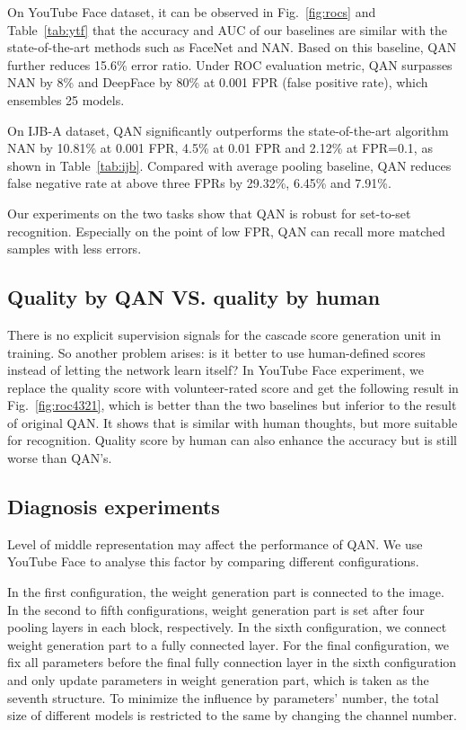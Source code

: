 \documentclass[10pt,twocolumn,letterpaper]{article}
\begin{document}
On YouTube Face dataset, it can be observed in Fig.~\ref{fig:rocs} and Table~\ref{tab:ytf} that the accuracy and AUC of our baselines are similar with the state-of-the-art methods such as FaceNet and NAN. Based on this baseline, QAN further reduces 15.6\% error ratio. Under ROC evaluation metric, QAN surpasses NAN by 8\% and DeepFace by 80\% at 0.001 FPR (false positive rate), which ensembles 25 models.

On IJB-A dataset, QAN significantly outperforms the state-of-the-art algorithm NAN by 10.81\% at 0.001 FPR, 4.5\% at 0.01 FPR and 2.12\% at FPR=0.1, as shown in Table~\ref{tab:ijb}. Compared with average pooling baseline, QAN reduces false negative rate at above three FPRs by 29.32\%, 6.45\% and 7.91\%.

Our experiments on the two tasks show that QAN is robust for set-to-set recognition. Especially on the point of low FPR, QAN can recall more matched samples with less errors.












\subsection{ Quality by QAN VS. quality by human}
\label{sec:humanscorebetter}
There is no explicit supervision signals for the cascade score generation unit in training. So another problem arises: is it better to use human-defined scores instead of letting the network learn itself? In YouTube Face experiment, we replace the quality score  with volunteer-rated score and get the following result in Fig.~\ref{fig:roc4321}, which is better than the two baselines but inferior to the result of original QAN. It shows that  is similar with human thoughts, but more suitable for recognition. Quality score by human can also enhance the accuracy but is still worse than QAN's.



\subsection{Diagnosis experiments}
Level of middle representation may affect the performance of QAN. We use YouTube Face to analyse this factor by comparing different configurations.




In the first configuration, the weight generation part is connected to the image. In the second to fifth configurations, weight generation part is set after four pooling layers in each block, respectively. In the sixth configuration, we connect weight generation part to a fully connected layer. For the final configuration, we fix all parameters before the final fully connection layer in the sixth configuration and only update parameters in weight generation part, which is taken as the seventh structure. To minimize the influence by parameters' number, the total size of different models is restricted to the same by changing the channel number. 
\end{document}
